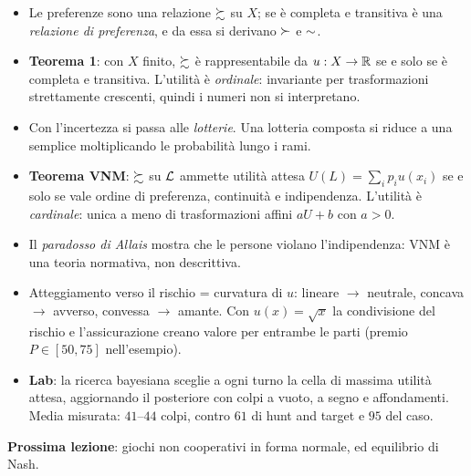 \begin{riepilogo}
\begin{itemize}
  \item Le preferenze sono una relazione $\succsim$ su $X$; se è completa e transitiva è una
        \emph{relazione di preferenza}, e da essa si derivano $\succ$ e $\sim$.
  \item \textbf{Teorema 1}: con $X$ finito, $\succsim$ è rappresentabile da $u : X \to \mathbb{R}$
        se e solo se è completa e transitiva. L'utilità è \emph{ordinale}: invariante per
        trasformazioni strettamente crescenti, quindi i numeri non si interpretano.
  \item Con l'incertezza si passa alle \emph{lotterie}. Una lotteria composta si riduce a
        una semplice moltiplicando le probabilità lungo i rami.
  \item \textbf{Teorema VNM}: $\succsim$ su $\mathcal{L}$ ammette utilità attesa
        $U(L) = \sum_i p_i u(x_i)$ se e solo se vale ordine di preferenza, continuità e
        indipendenza. L'utilità è \emph{cardinale}: unica a meno di trasformazioni affini
        $aU + b$ con $a>0$.
  \item Il \emph{paradosso di Allais} mostra che le persone violano l'indipendenza: VNM è
        una teoria normativa, non descrittiva.
  \item Atteggiamento verso il rischio = curvatura di $u$: lineare $\to$ neutrale,
        concava $\to$ avverso, convessa $\to$ amante. Con $u(x) = \sqrt{x}$ la
        condivisione del rischio e l'assicurazione creano valore per entrambe le parti
        (premio $P \in [50,75]$ nell'esempio).
  \item \textbf{Lab}: la ricerca bayesiana sceglie a ogni turno la cella di massima utilità
        attesa, aggiornando il posteriore con colpi a vuoto, a segno e affondamenti.
        Media misurata: $41$--$44$ colpi, contro $61$ di hunt and target e $95$ del caso.
\end{itemize}
\textbf{Prossima lezione}: giochi non cooperativi in forma normale,  ed
equilibrio di Nash.
\end{riepilogo}
